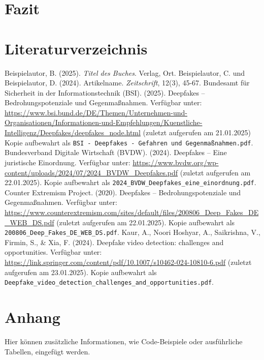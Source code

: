 \documentclass[a4paper,12pt]{article}
\begin{document}
\section{Fazit}



\newpage
{}
\section*{Literaturverzeichnis}
\begin{thebibliography}{99}
     Beispielautor, B. (2025). 
    \textit{Titel des Buches}. Verlag, Ort.
     Beispielautor, C. und Beispielautor, D. (2024). Artikelname. 
    \textit{Zeitschrift}, 12(3), 45-67.
     Bundesamt für Sicherheit in der Informationstechnik (BSI). (2025). Deepfakes – Bedrohungspotenziale und Gegenmaßnahmen. 
    Verfügbar unter: \url{https://www.bsi.bund.de/DE/Themen/Unternehmen-und-Organisationen/Informationen-und-Empfehlungen/Kuenstliche-Intelligenz/Deepfakes/deepfakes_node.html} (zuletzt aufgerufen am 21.01.2025) Kopie aufbewahrt als \texttt{BSI - Deepfakes - Gefahren und Gegenmaßnahmen.pdf}.
     Bundesverband Digitale Wirtschaft (BVDW). (2024). Deepfakes – Eine juristische Einordnung. 
    Verfügbar unter: \url{https://www.bvdw.org/wp-content/uploads/2024/07/2024_BVDW_Deepfakes.pdf} (zuletzt aufgerufen am 22.01.2025). Kopie aufbewahrt als \texttt{2024\_BVDW\_Deepfakes\_eine\_einordnung.pdf}.
     Counter Extremism Project. (2020). Deepfakes – Bedrohungspotenziale und Gegenmaßnahmen.
    Verfügbar unter: \url{https://www.counterextremism.com/sites/default/files/200806_Deep_Fakes_DE_WEB_DS.pdf} (zuletzt aufgerufen am 22.01.2025). Kopie aufbewahrt als \texttt{200806\_Deep\_Fakes\_DE\_WEB\_DS.pdf}.
     Kaur, A., Noori Hoshyar, A., Saikrishna, V., Firmin, S., \& Xia, F. (2024). Deepfake video detection: challenges and opportunities. Verfügbar unter: 
    \url{https://link.springer.com/content/pdf/10.1007/s10462-024-10810-6.pdf} (zuletzt aufgerufen am 23.01.2025).
    Kopie aufbewahrt als \texttt{Deepfake\_video\_detection\_challenges\_and\_opportunities.pdf}.


\end{thebibliography}

\newpage
\appendix
\section{Anhang}
Hier können zusätzliche Informationen, wie Code-Beispiele oder ausführliche Tabellen, eingefügt werden.
\end{document}
